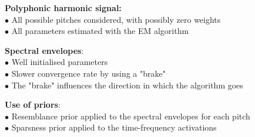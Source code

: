 \documentclass[landscape,final]{baposter}
\theoremstyle{definition}
\begin{document}
\begin{poster}
{\vspace{1mm}
\textbf{Polyphonic harmonic signal:} \\
$\bullet$ All possible pitches considered, with possibly zero weights \\
$\bullet$ All parameters estimated with the EM algorithm

\vspace{1mm}
\textbf{Spectral envelopes}: \\
$\bullet$ Well initialised parameters  \\
$\bullet$ Slower convergence rate by using a "brake" \\
$\bullet$ The "brake" influences the direction in which the algorithm goes

\vspace{1mm}
\textbf{Use of priors}: \\
$\bullet$ Resemblance prior applied to the spectral envelopes for each pitch \\
$\bullet$ Sparsness prior applied to the time-frequency activations
}


\end{poster}
\end{document}
